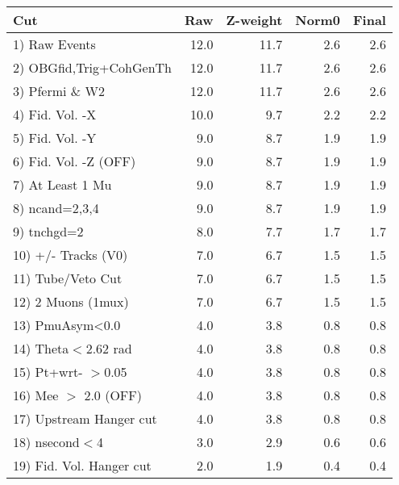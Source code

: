  \begin{table}[h!]\centering
 \begin{tabular}{||l||r|r|r|r||}
 \hline
 \hline
 Cut & Raw & Z-weight & Norm0 & Final \\
 \hline
  1) Raw Events           &        12.0 &        11.7 &         2.6 &         2.6 \\
  2) OBGfid,Trig+CohGenTh &        12.0 &        11.7 &         2.6 &         2.6 \\
  3) Pfermi \& W2         &        12.0 &        11.7 &         2.6 &         2.6 \\
  4) Fid. Vol. -X         &        10.0 &         9.7 &         2.2 &         2.2 \\
  5) Fid. Vol. -Y         &         9.0 &         8.7 &         1.9 &         1.9 \\
  6) Fid. Vol. -Z (OFF)   &         9.0 &         8.7 &         1.9 &         1.9 \\
  7) At Least 1 Mu        &         9.0 &         8.7 &         1.9 &         1.9 \\
  8) ncand=2,3,4          &         9.0 &         8.7 &         1.9 &         1.9 \\
  9) tnchgd=2             &         8.0 &         7.7 &         1.7 &         1.7 \\
 10) +/- Tracks (V0)      &         7.0 &         6.7 &         1.5 &         1.5 \\
 11) Tube/Veto Cut        &         7.0 &         6.7 &         1.5 &         1.5 \\
 12) 2 Muons (1mux)       &         7.0 &         6.7 &         1.5 &         1.5 \\
 13) PmuAsym<0.0          &         4.0 &         3.8 &         0.8 &         0.8 \\
 14) Theta$<$2.62 rad     &         4.0 &         3.8 &         0.8 &         0.8 \\
 15) Pt+wrt- $>$0.05      &         4.0 &         3.8 &         0.8 &         0.8 \\
 16) Mee $>$ 2.0  (OFF)   &         4.0 &         3.8 &         0.8 &         0.8 \\
 17) Upstream Hanger cut  &         4.0 &         3.8 &         0.8 &         0.8 \\
 18) nsecond$<$4          &         3.0 &         2.9 &         0.6 &         0.6 \\
 19) Fid. Vol. Hanger cut &         2.0 &         1.9 &         0.4 &         0.4 \\

\end{tabular}
\end{table}
